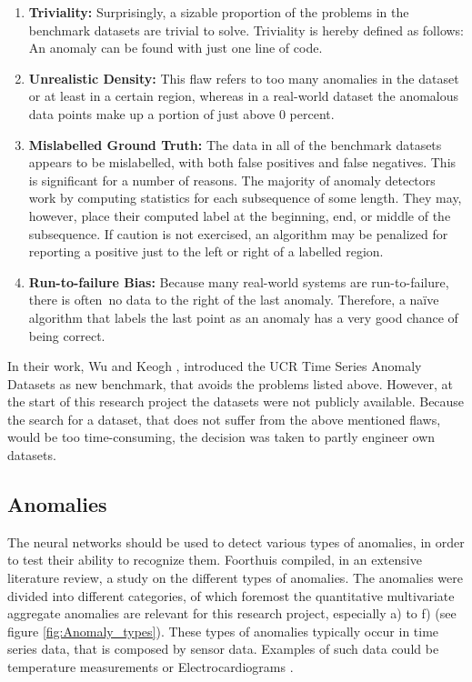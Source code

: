 \begin{enumerate}
	\item \textbf{Triviality:} Surprisingly, a sizable proportion of the problems in the benchmark datasets are trivial to solve. Triviality is hereby defined as follows: An anomaly can be found with just one line of code.
	\item \textbf{Unrealistic Density:} This flaw refers to too many anomalies in the dataset or at least in a certain region, whereas in a real-world dataset the anomalous data points make up a portion of just above 0 percent.   
	\item \textbf{Mislabelled Ground Truth:} The data in all of the benchmark datasets appears to be mislabelled, with both false positives and false negatives. This is significant for a number of reasons. The majority of anomaly detectors work by computing statistics for each subsequence of some length. They may, however, place their computed label at the beginning, end, or middle of the subsequence. If caution is not exercised, an algorithm may be penalized for reporting a positive just to the left or right of a labelled region.
	\item \textbf{Run-to-failure Bias:} Because many real-world systems are run-to-failure, there is often no data to the right of the last anomaly. Therefore, a naïve algorithm that labels the last point as an anomaly has a very good chance of being correct.
\end{enumerate}

In their work, Wu and Keogh \parencite*{Wu2020}, introduced the UCR Time Series Anomaly Datasets as new benchmark, that avoids the problems listed above. However, at the start of this research project the datasets were not publicly available. Because the search for a dataset, that does not suffer from the above mentioned flaws, would be too time-consuming, the decision was taken to partly engineer own datasets.
\newline
\subsection{Anomalies}
The neural networks should be used to detect various types of anomalies, in order to test their ability to recognize them. Foorthuis \parencite*{Foorthuis2021} compiled, in an extensive literature review, a study on the different types of anomalies. The anomalies were divided into different categories, of which foremost the quantitative multivariate aggregate anomalies are relevant for this research project, especially a) to f) (see figure \ref{fig:Anomaly_types}). These types of anomalies typically occur in time series data, that is composed by sensor data. Examples of such data could be temperature measurements or Electrocardiograms \parencite{Malhotra2015}.

